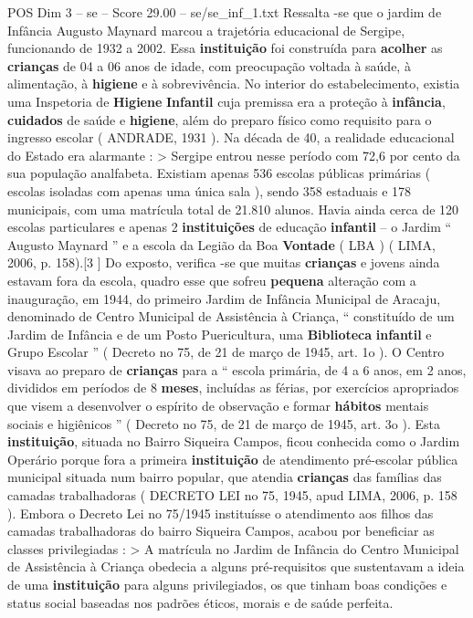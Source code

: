 \begin{textsample}{POS Dim 3 – se – Score 29.00 – se/se\_inf\_1.txt}
Ressalta -se que o jardim de Infância Augusto Maynard marcou a trajetória educacional de Sergipe, funcionando de 1932 a 2002.
Essa \textbf{instituição} foi construída para \textbf{acolher} as \textbf{crianças} de 04 a 06 anos de idade, com preocupação voltada à saúde, à alimentação, à \textbf{higiene} e à sobrevivência.
No interior do estabelecimento, existia uma Inspetoria de \textbf{Higiene} \textbf{Infantil} cuja premissa era a proteção à \textbf{infância}, \textbf{cuidados} de saúde e \textbf{higiene}, além do preparo físico como requisito para o ingresso escolar ( ANDRADE, 1931 ).
Na década de 40, a realidade educacional do Estado era alarmante : > Sergipe entrou nesse período com 72,6 por cento da sua população analfabeta.
Existiam apenas 536 escolas públicas primárias ( escolas isoladas com apenas uma única sala ), sendo 358 estaduais e 178 municipais, com uma matrícula total de 21.810 alunos.
Havia ainda cerca de 120 escolas particulares e apenas 2 \textbf{instituições} de educação \textbf{infantil} – o Jardim “ Augusto Maynard ” e a escola da Legião da Boa \textbf{Vontade} ( LBA ) ( LIMA, 2006, p. 158).[3 ] Do exposto, verifica -se que muitas \textbf{crianças} e jovens ainda estavam fora da escola, quadro esse que sofreu \textbf{pequena} alteração com a inauguração, em 1944, do primeiro Jardim de Infância Municipal de Aracaju, denominado de Centro Municipal de Assistência à Criança, “ constituído de um Jardim de Infância e de um Posto Puericultura, uma \textbf{Biblioteca} \textbf{infantil} e Grupo Escolar ” ( Decreto no 75, de 21 de março de 1945, art. 1o ).
O Centro visava ao preparo de \textbf{crianças} para a “ escola primária, de 4 a 6 anos, em 2 anos, divididos em períodos de 8 \textbf{meses}, incluídas as férias, por exercícios apropriados que visem a desenvolver o espírito de observação e formar \textbf{hábitos} mentais sociais e higiênicos ” ( Decreto no 75, de 21 de março de 1945, art. 3o ).
Esta \textbf{instituição}, situada no Bairro Siqueira Campos, ficou conhecida como o Jardim Operário porque fora a primeira \textbf{instituição} de atendimento pré-escolar pública municipal situada num bairro popular, que atendia \textbf{crianças} das famílias das camadas trabalhadoras ( DECRETO LEI no 75, 1945, apud LIMA, 2006, p. 158 ).
Embora o Decreto Lei no 75/1945 instituísse o atendimento aos filhos das camadas trabalhadoras do bairro Siqueira Campos, acabou por beneficiar as classes privilegiadas : > A matrícula no Jardim de Infância do Centro Municipal de Assistência à Criança obedecia a alguns pré-requisitos que sustentavam a ideia de uma \textbf{instituição} para alguns privilegiados, os que tinham boas condições e status social baseadas nos padrões éticos, morais e de saúde perfeita.

\end{textsample}
